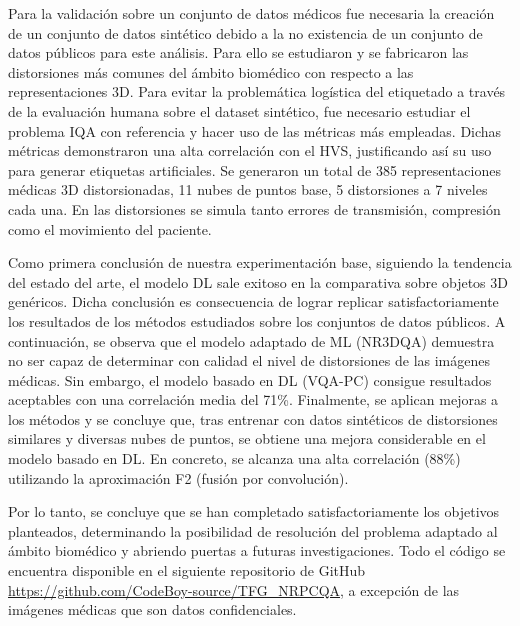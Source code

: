 Para la validación sobre un conjunto de datos médicos fue necesaria la creación 
de un conjunto de datos sintético debido a la no existencia de un conjunto de 
datos públicos para este análisis. Para ello se estudiaron y se fabricaron las distorsiones más 
comunes del ámbito biomédico con respecto a las representaciones 3D. 
Para evitar la problemática logística del etiquetado a través de la 
evaluación humana sobre el dataset sintético, 
fue necesario estudiar el problema IQA con referencia y hacer uso de las métricas 
más empleadas. Dichas métricas demonstraron una alta correlación con el HVS, 
justificando así su uso para generar etiquetas artificiales.
Se generaron un total de 385 representaciones médicas 3D distorsionadas, 11 nubes de puntos 
base, 5 distorsiones a 7 niveles cada una. En las distorsiones se simula 
tanto errores de transmisión, compresión como el movimiento del paciente.

Como primera conclusión de nuestra experimentación base, 
siguiendo la tendencia del estado del arte, el modelo DL sale exitoso en la 
comparativa sobre objetos 3D genéricos. Dicha conclusión es consecuencia 
de lograr replicar satisfactoriamente los resultados de los métodos estudiados 
sobre los conjuntos de datos públicos.
A continuación, se observa que el modelo adaptado de ML (NR3DQA) demuestra no 
ser capaz de determinar con calidad el nivel de distorsiones de las imágenes médicas. 
Sin embargo, el modelo basado en DL (VQA-PC) consigue resultados aceptables con 
una correlación media del 71\%.
Finalmente, se aplican mejoras a los métodos 
y se concluye que, tras entrenar con datos sintéticos de distorsiones similares y 
diversas nubes de puntos, se obtiene una mejora considerable en el modelo basado en DL. 
En concreto, se alcanza una alta correlación (88\%) utilizando la aproximación F2 
(fusión por convolución).

Por lo tanto, se concluye que se han completado satisfactoriamente los objetivos 
planteados, determinando la posibilidad de resolución del problema adaptado 
al ámbito biomédico y abriendo puertas a futuras investigaciones. 
Todo el código se encuentra disponible en el siguiente repositorio de 
GitHub \url{https://github.com/CodeBoy-source/TFG_NRPCQA},
a excepción de las imágenes médicas que son datos confidenciales.

